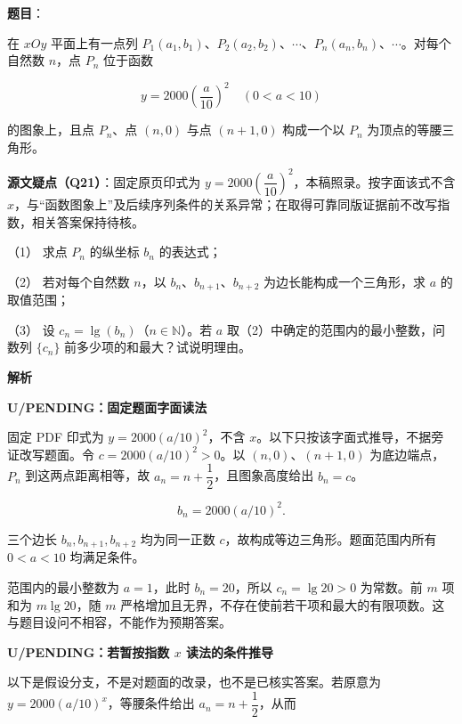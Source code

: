 \begin{answer}

\textbf{题目}：

在 $xOy$ 平面上有一点列 $P_1(a_1,b_1)$、$P_2(a_2,b_2)$、$\cdots$、$P_n(a_n,b_n)$、$\cdots$。对每个自然数 $n$，点 $P_n$ 位于函数

\nopagebreak[4]
\[
y=2000\left(\dfrac{a}{10}\right)^2\quad(0<a<10)
\]

的图象上，且点 $P_n$、点 $(n,0)$ 与点 $(n+1,0)$ 构成一个以 $P_n$ 为顶点的等腰三角形。

\begin{gktip}
\textbf{源文疑点（Q21）}：固定原页印式为 $y=2000\left(\dfrac{a}{10}\right)^2$，本稿照录。按字面该式不含 $x$，与“函数图象上”及后续序列条件的关系异常；在取得可靠同版证据前不改写指数，相关答案保持待核。
\end{gktip}

（1） 求点 $P_n$ 的纵坐标 $b_n$ 的表达式；

（2） 若对每个自然数 $n$，以 $b_n$、$b_{n+1}$、$b_{n+2}$ 为边长能构成一个三角形，求 $a$ 的取值范围；

（3） 设 $c_n=\lg(b_n)$（$n\in\mathbb{N}$）。若 $a$ 取（2）中确定的范围内的最小整数，问数列 $\{c_n\}$ 前多少项的和最大？试说明理由。

\textbf{解析}

\textbf{U/PENDING：固定题面字面读法}

固定 PDF 印式为 $y=2000(a/10)^2$，不含 $x$。以下只按该字面式推导，不据旁证改写题面。令 $c=2000(a/10)^2>0$。以 $(n,0)$、$(n+1,0)$ 为底边端点，$P_n$ 到这两点距离相等，故 $a_n=n+\dfrac12$，且图象高度给出 $b_n=c$。


\nopagebreak[4]
\[
b_n=2000(a/10)^2.
\]

三个边长 $b_n,b_{n+1},b_{n+2}$ 均为同一正数 $c$，故构成等边三角形。题面范围内所有 $0<a<10$ 均满足条件。

范围内的最小整数为 $a=1$，此时 $b_n=20$，所以 $c_n=\lg20>0$ 为常数。前 $m$ 项和为 $m\lg20$，随 $m$ 严格增加且无界，不存在使前若干项和最大的有限项数。这与题目设问不相容，不能作为预期答案。

\textbf{U/PENDING：若暂按指数 $x$ 读法的条件推导}

以下是假设分支，不是对题面的改录，也不是已核实答案。若原意为 $y=2000(a/10)^x$，等腰条件给出 $a_n=n+\dfrac12$，从而


\end{answer}
